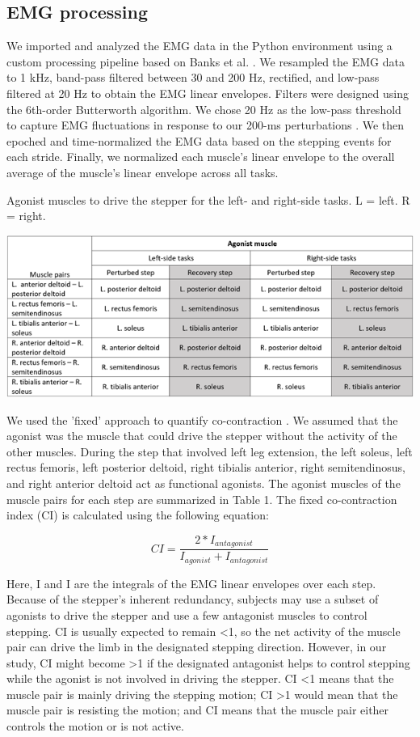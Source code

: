 \documentclass[../thesis_seyed.tex]{subfiles}
\begin{document}
\subsection{EMG processing}
We imported and analyzed the EMG data in the Python environment using a custom processing pipeline based on Banks et al. \cite{Banks2017-dn}. We resampled the EMG data to 1 kHz, band-pass filtered between 30 and 200 Hz, rectified, and low-pass filtered at 20 Hz to obtain the EMG linear envelopes. Filters were designed using the 6th-order Butterworth algorithm. We chose 20 Hz as the low-pass threshold to capture EMG fluctuations in response to our 200-ms perturbations \cite{Shiavi1998-vu}. We then epoched and time-normalized the EMG data based on the stepping events for each stride. Finally, we normalized each muscle's linear envelope to the overall average of the muscle's linear envelope across all tasks.

\begin{table}[H]
    \centering
    \caption{Agonist muscles to drive the stepper for the left- and right-side tasks. L = left. R = right.}
    \includegraphics{../img/agonist.png}
    \label{tab:agonist}
\end{table}

We used the 'fixed' approach to quantify co-contraction \cite{Banks2017-dn}. We assumed that the agonist was the muscle that could drive the stepper without the activity of the other muscles. During the step that involved left leg extension, the left soleus, left rectus femoris, left posterior deltoid, right tibialis anterior, right semitendinosus, and right anterior deltoid act as functional agonists. The agonist muscles of the muscle pairs for each step are summarized in Table 1. The fixed co-contraction index (CI) is calculated using the following equation:

\[CI=\frac{2*I_{antagonist}}{I_{agonist}+I_{antagonist}}\]

Here, I and I are the integrals of the EMG linear envelopes over each step. Because of the stepper's inherent redundancy, subjects may use a subset of agonists to drive the stepper and use a few antagonist muscles to control stepping. CI is usually expected to remain <1, so the net activity of the muscle pair can drive the limb in the designated stepping direction. However, in our study, CI might become >1 if the designated antagonist helps to control stepping while the agonist is not involved in driving the stepper. CI <1 means that the muscle pair is mainly driving the stepping motion; CI >1 would mean that the muscle pair is resisting the motion; and CI  means that the muscle pair either controls the motion or is not active.
\end{document}
